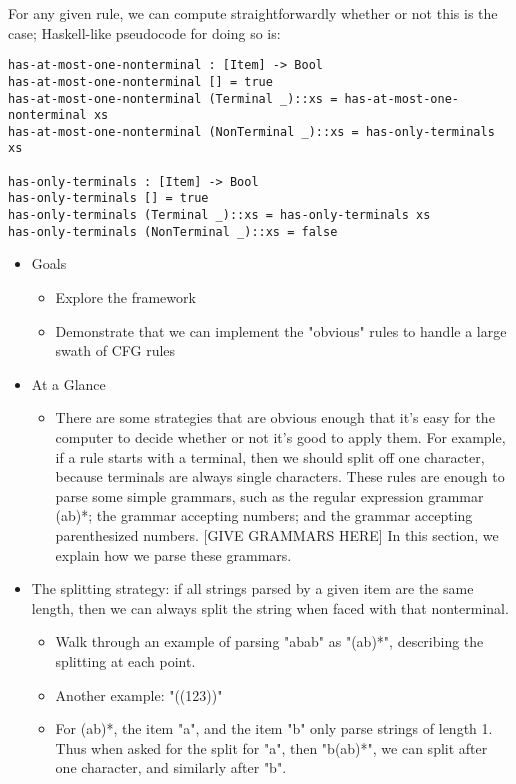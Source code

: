     For any given rule, we can compute straightforwardly whether or not this is the case; Haskell-like pseudocode for doing so is:
\begin{verbatim}
has-at-most-one-nonterminal : [Item] -> Bool
has-at-most-one-nonterminal [] = true
has-at-most-one-nonterminal (Terminal _)::xs = has-at-most-one-nonterminal xs
has-at-most-one-nonterminal (NonTerminal _)::xs = has-only-terminals xs

has-only-terminals : [Item] -> Bool
has-only-terminals [] = true
has-only-terminals (Terminal _)::xs = has-only-terminals xs
has-only-terminals (NonTerminal _)::xs = false
\end{verbatim}
  \begin{itemize} \item  Goals
    \begin{itemize} \item  Explore the framework 
    \item  Demonstrate that we can implement the "obvious" rules to handle a large swath of CFG rules \end{itemize}
  \item  At a Glance
    \begin{itemize} \item  There are some strategies that are obvious enough that it's easy for the computer to decide whether or not it's good to apply them.  For example, if a rule starts with a terminal, then we should split off one character, because terminals are always single characters.  These rules are enough to parse some simple grammars, such as the regular expression grammar (ab)*; the grammar accepting numbers; and the grammar accepting parenthesized numbers.  {}[GIVE GRAMMARS HERE]  In this section, we explain how we parse these grammars. \end{itemize}
  \item  The splitting strategy: if all strings parsed by a given item are the same length, then we can always split the string when faced with that nonterminal.
    \begin{itemize} \item  Walk through an example of parsing "abab" as "(ab)*", describing the splitting at each point. 
    \item  Another example: "((123))" 
    \item  For (ab)*, the item "a", and the item "b" only parse strings of length 1.  Thus when asked for the split for "a", then "b(ab)*", we can split after one character, and similarly after "b".  

\end{itemize}
\end{itemize}
